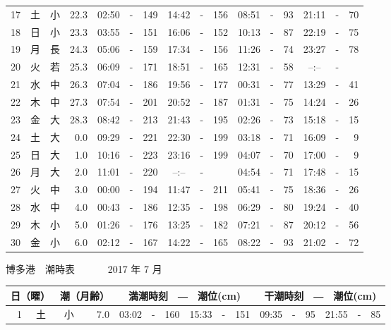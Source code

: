 \documentclass[12pt.a4j]{jsarticle}
\begin{document}
\begin{center}
\begin{table}[ht]
\begin{tabular}{|rc|cr|ccrccr|ccrccr|}
17 & 土 & 小 & 22.3 &  02:50 &-& 149  &  14:42 &-& 156  &   08:51 &-&  93  &   21:11 &-&  70  \\
18 & 日 & 小 & 23.3 &  03:55 &-& 151  &  16:06 &-& 152  &   10:13 &-&  87  &   22:19 &-&  75  \\
19 & 月 & 長 & 24.3 &  05:06 &-& 159  &  17:34 &-& 156  &   11:26 &-&  74  &   23:27 &-&  78  \\
20 & 火 & 若 & 25.3 &  06:09 &-& 171  &  18:51 &-& 165  &   12:31 &-&  58  &   --:-- &-&     \\
21 & 水 & 中 & 26.3 &  07:04 &-& 186  &  19:56 &-& 177  &   00:31 &-&  77  &   13:29 &-&  41  \\
22 & 木 & 中 & 27.3 &  07:54 &-& 201  &  20:52 &-& 187  &   01:31 &-&  75  &   14:24 &-&  26  \\
23 & 金 & 大 & 28.3 &  08:42 &-& 213  &  21:43 &-& 195  &   02:26 &-&  73  &   15:18 &-&  15  \\
24 & 土 & 大 &  0.0 &  09:29 &-& 221  &  22:30 &-& 199  &   03:18 &-&  71  &   16:09 &-&   9  \\
25 & 日 & 大 &  1.0 &  10:16 &-& 223  &  23:16 &-& 199  &   04:07 &-&  70  &   17:00 &-&   9  \\
26 & 月 & 大 &  2.0 &  11:01 &-& 220  &  --:-- &-&     &   04:54 &-&  71  &   17:48 &-&  15  \\
27 & 火 & 中 &  3.0 &  00:00 &-& 194  &  11:47 &-& 211  &   05:41 &-&  75  &   18:36 &-&  26  \\
28 & 水 & 中 &  4.0 &  00:43 &-& 186  &  12:35 &-& 198  &   06:29 &-&  80  &   19:24 &-&  40  \\
29 & 木 & 小 &  5.0 &  01:26 &-& 176  &  13:25 &-& 182  &   07:21 &-&  87  &   20:12 &-&  56  \\
30 & 金 & 小 &  6.0 &  02:12 &-& 167  &  14:22 &-& 165  &   08:22 &-&  93  &   21:02 &-&  72  \\
   \hline
   \end{tabular}
\end{table}
\newpage
 {\LARGE 博多港　潮時表　　　}
 {\large 2017 年  7 月}\\
 \begin{table}[ht]
    \begin{tabular}{|rc|cr|ccrccr|ccrccr|}
    \hline
    \multicolumn{2}{|c|}{日（曜）} & \multicolumn{2}{c|}{潮（月齢）} & \multicolumn{6}{c|}{満潮時刻　―　潮位(cm)} & \multicolumn{6}{c|}{干潮時刻　―　潮位(cm)} \\
 \hline
 1 & 土 & 小 &  7.0 &  03:02 &-& 160  &  15:33 &-& 151  &   09:35 &-&  95  &   21:55 &-&  85  \\

\end{tabular}
\end{table}
\end{center}
\end{document}
